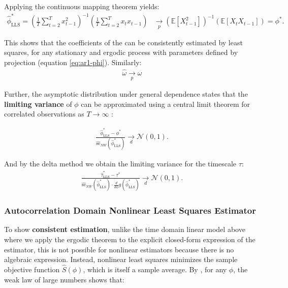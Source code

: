 \documentclass[main.tex]{subfiles}
\begin{document}
\noindent Applying the continuous mapping theorem yields:
\begin{align}
    \hat\phi^*_{\scriptscriptstyle\text{LLS}} = (\frac{1}{T} \sum_{t=2}^T x_{t-1}^2)^{-1} ( \frac{1}{T} \sum_{t=2}^T x_t x_{t-1}) &\underset{p}{\to} (\mathbb{E}[X_{t-1}^2])^{-1}(\mathbb{E}[X_t X_{t-1}]) = \phi^*.
\end{align}

\noindent This shows that the coefficients of the  can be consistently estimated by least squares, for any stationary and ergodic process with parameters defined by projection (equation \eqref{eq:ar1-phi}). Similarly:
\begin{align}
    \hat \omega \underset{p}{\to} \omega
\end{align}

Further, the asymptotic distribution under general dependence states that the \textbf{limiting variance} of $\phi$ can be approximated using a central limit theorem for correlated observations as $T\to\infty$ \citet[theorem~14.33]{hansen_econometrics_2022}:

\begin{align} \label{eq:ar1-phi-clt}
\frac{\hat\phi^*_{\scriptscriptstyle\text{LLS}} - \phi^*}{\widehat{\text{se}}_{NW}(\hat\phi^*_{\scriptscriptstyle\text{LLS}})} \underset{d}{\to} \mathcal{N}(0, 1).
\end{align}

\noindent And by the delta method we obtain the limiting variance for the timescale $\tau$:
\begin{align}
    \frac{\hat{\tau}^*_{\scriptscriptstyle\text{LLS}} - \tau^*}{\widehat{\text{se}}_{NW}(\hat{\phi}^*_{\scriptscriptstyle\text{LLS}}) \cdot \frac{d}{d\phi} g(\hat \phi^*_{\scriptscriptstyle\text{LLS}})} \underset{d}{\to} \mathcal{N}(0,1).
\end{align}



\subsubsection{Autocorrelation Domain Nonlinear Least Squares Estimator}

To show \textbf{consistent estimation}, unlike the time domain linear model above where we apply the ergodic theorem to the explicit closed-form expression of the estimator, this is not possible for nonlinear estimators because there is no algebraic expression. Instead, nonlinear least squares minimizes the sample objective function $\widehat{S}(\phi)$, which is itself a sample average. By \citet[theorem~22.1]{hansen_econometrics_2022}, for any $\phi$, the weak law of large numbers shows that:
\end{document}
